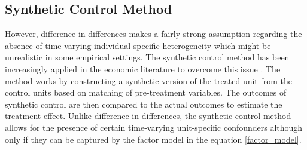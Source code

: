 \subsection{Synthetic Control Method} \label{subsec:sc_methodology}
However, difference-in-differences makes a fairly strong assumption regarding the absence of time-varying individual-specific heterogeneity which might be unrealistic in some empirical settings.
The synthetic control method has been increasingly applied in the economic literature to overcome this issue \citep{abadie_economic_2003, abadie_synthetic_2010, billmeier_assessing_2013, cavallo_catastrophic_2013}. The method works by constructing a synthetic version of the treated unit from the control units  based on matching of pre-treatment variables. The outcomes of synthetic control are then compared to the actual outcomes  to estimate the treatment effect.
Unlike difference-in-differences, the synthetic control method allows for the presence of certain time-varying unit-specific confounders although only if they can be  captured by the factor model in the equation \ref{factor_model}.




